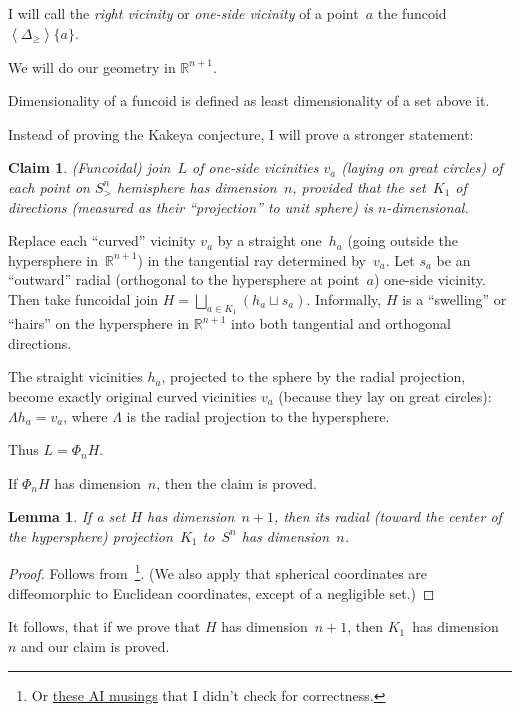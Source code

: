 \documentclass[oneside,draft]{amsart}
\newcommand{\supfun}[1]{\left\langle#1\right\rangle}
\newtheorem{lem}{Lemma}
\newtheorem{claim}{Claim}
\begin{document}
I will call the \emph{right vicinity} or \emph{one-si\-de vicinity} of a point~$a$ the funcoid~$\supfun{\Delta_{\geq}}\{a\}$.

We will do our geometry in $\mathbb{R}^{n+1}$.

Dimensionality of a funcoid is defined as least dimensionality of a set above it.

Instead of proving the Kakeya conjecture, I will prove a stronger statement:

\begin{claim}
(Funcoidal) join~$L$ of one-si\-de vicinities $v_a$ (laying on great circles) of each point on $S^n_{>}$ hemisphere has dimension~$n$, provided that the set~$K_1$ of directions (measured as their ``projection'' to unit sphere) is $n$-di\-men\-sio\-nal.
\end{claim}

Replace each ``curved'' vicinity $v_a$ by a straight one~$h_a$ (going outside the hypersphere in~$\mathbb{R}^{n+1}$) in the tangential ray determined by~$v_a$. Let $s_a$ be an ``outward'' radial (orthogonal to the hypersphere at point~$a$) one-si\-de vicinity. Then take funcoidal join $H=\bigsqcup_{a\in K_1}(h_a\sqcup s_a)$. Informally, $H$ is a ``swelling'' or ``hairs'' on the hypersphere in $\mathbb{R}^{n+1}$ into both tangential and orthogonal directions.

The straight vicinities $h_a$, projected to the sphere by the radial projection, become exactly original curved vicinities $v_a$ (because they lay on great circles): $\Lambda h_a=v_a$, where $\Lambda$ is the radial projection to the hypersphere.

Thus $L = \Phi_n H$.

If $\Phi_n H$ has dimension~$n$, then the claim is proved.

\begin{lem}
If a set $H$ has dimension~$n+1$, then its radial (toward the center of the hypersphere) projection~$K_1$ to~$S^n$ has dimension~$n$.
\end{lem}

\begin{proof}
Follows from~\cite{189275}\footnote{Or \href{https://grok.com/share/bGVnYWN5_2e0aef8b-4309-420f-815c-a09d76ae97c1}{these AI musings}
that I didn't check for correctness.}.
(We also apply that spherical coordinates are diffeomorphic to Euclidean coordinates, except of a negligible set.)
\end{proof}

It follows, that if we prove that $H$ has dimension~$n+1$, then $K_1$~has dimension~$n$ and our claim is proved.
\end{document}
